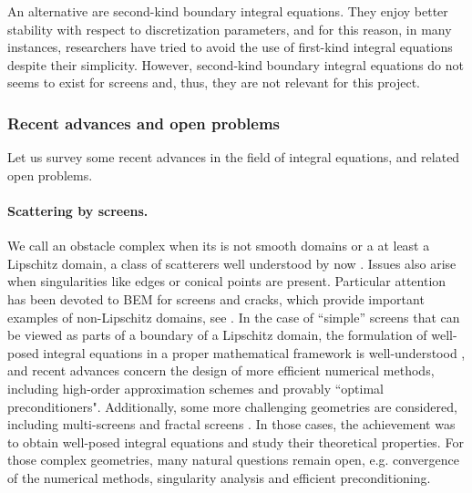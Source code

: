 \documentclass[]{report}
\begin{document}
An alternative are second-kind boundary integral equations. They enjoy better stability with
respect to discretization parameters, and for this reason, in many instances, researchers
have tried to avoid the use of first-kind integral equations despite their
simplicity. However, second-kind boundary integral equations do not seems to exist for
screens and, thus, they are not relevant for this project. 

\subsubsection*{Recent advances and open problems}

Let us survey some recent advances in the field of integral equations, and related open problems.

\paragraph{Scattering by screens.} We call an obstacle complex when its is not smooth
domains or a at least a Lipschitz domain, a class of scatterers well understood by now
\cite{mclean2000strongly}. Issues also arise when singularities like edges or conical
points are present. Particular attention has been devoted to BEM for screens and cracks,
which provide important examples of non-Lipschitz domains, see
\cite{bruno2013high,gimperlein2019optimal,hiptmair2018closed,hiptmair2019preconditioning,hiptmair2020optimal,hiptmair2020compact,ramaciotti2017some}. In
the case of ``simple'' screens that can be viewed as parts of a boundary of a Lipschitz
domain, the formulation of well-posed integral equations in a proper mathematical
framework is well-understood \cite{stephan1984augmented,wendland1990hypersingular}, and
recent advances concern the design of more efficient numerical methods, including
high-order approximation schemes and provably ``optimal preconditioners". Additionally,
some more challenging geometries are considered, including multi-screens
\cite{claeys2013integral,claeys2020quotient} and fractal screens
\cite{chandlerWilde2017sobolev}. In those cases, the achievement was to obtain well-posed
integral equations and study their theoretical properties. For those complex geometries,
many natural questions remain open, e.g. convergence of the numerical methods, singularity
analysis and efficient preconditioning.
\end{document}
